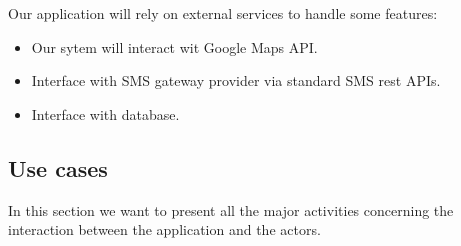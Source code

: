 Our application will rely on external services to handle some features:

\begin{itemize}
    \item Our sytem will interact wit Google Maps API.
    \item Interface with SMS gateway provider via standard SMS rest APIs.
    \item Interface with database. %
\end{itemize}

\subsection{Use cases}
\label{subsect:usecases} 

In this section we want to present all the major activities concerning the interaction between the application and the actors.


